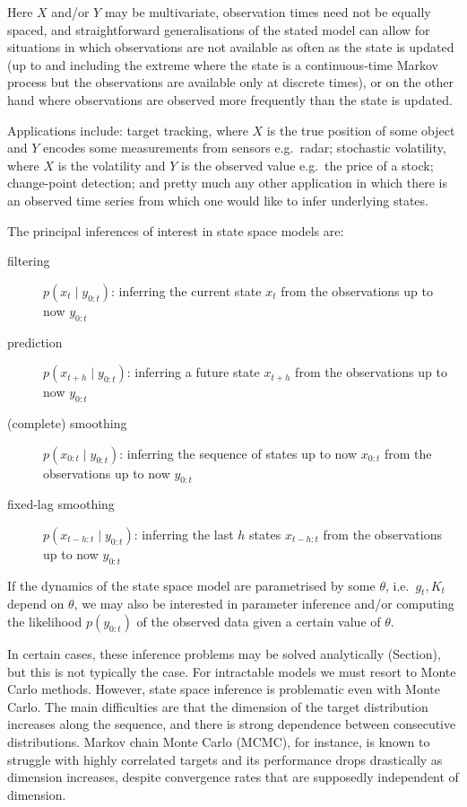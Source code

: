 Here $X$ and/or $Y$ may be multivariate, observation times need not be equally spaced, and straightforward generalisations of the stated model can allow for situations in which observations are not available as often as the state is updated (up to and including the extreme where the state is a continuous-time Markov process but the observations are available only at discrete times), or on the other hand where observations are observed more frequently than the state is updated.

Applications include: target tracking, where $X$ is the true position of some object and $Y$ encodes some measurements from sensors e.g.\ radar; stochastic volatility, where $X$ is the volatility and $Y$ is the observed value e.g.\ the price of a stock; change-point detection; and pretty much any other application in which there is an observed time series from which one would like to infer underlying states.

The principal inferences of interest in state space models are:
\begin{description}
\item [filtering] $p(x_t\mid y_{0:t})$: inferring the current state $x_t$ from the observations up to now $y_{0:t}$
\item [prediction] $p(x_{t+h}\mid y_{0:t})$: inferring a future state $x_{t+h}$ from the observations up to now $y_{0:t}$
\item [(complete) smoothing] $p(x_{0:t}\mid y_{0:t})$: inferring the sequence of states up to now $x_{0:t}$ from the observations up to now $y_{0:t}$
\item [fixed-lag smoothing] $p(x_{t-h:t}\mid y_{0:t})$: inferring the last $h$ states $x_{t-h:t}$ from the observations up to now $y_{0:t}$
\end{description}
If the dynamics of the state space model are parametrised by some $\theta$, i.e.\ $g_t, K_t$ depend on $\theta$, we may also be interested in parameter inference and/or computing the likelihood $p(y_{0:t})$ of the observed data given a certain value of $\theta$.

In certain cases, these inference problems may be solved analytically (Section), but this is not typically the case. For intractable models we must resort to Monte Carlo methods. However, state space inference is problematic even with Monte Carlo. 
The main difficulties are that the dimension of the target distribution increases along the sequence, and there is strong dependence between consecutive distributions. Markov chain Monte Carlo (MCMC), for instance, is known to struggle with highly correlated targets\seb{[citation]} and its performance drops drastically as dimension increases, despite convergence rates that are supposedly independent of dimension\seb{[citation]}.

